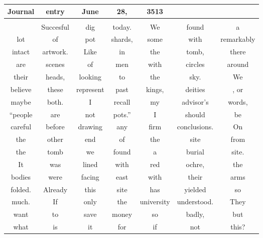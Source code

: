 {
  \Large
  \normalfont\wedn
\begin{tabular}{|ccccccc|}
  \hline
  Journal & entry & June & 28, & 3513 & & \\
  \hline
          & & & & & & \\
  \hline
          & Succesful & dig & today. & We & found & a \\
  \hline
  lot & of & pot & shards, & some & with & remarkably \\
  \hline
  intact & artwork. & Like & in & the & tomb, & there \\
  \hline
  are & scenes & of & men & with & circles & around \\
  \hline
  their & heads, & looking & to & the & sky. & We \\
  \hline
  believe & these & represent & past & kings, & deities &, or \\
  \hline
  maybe & both. & I & recall & my & advisor's & words, \\
  \hline
  ``people & are & not & pots.'' & I & should & be \\
  \hline
  careful & before & drawing & any & firm & conclusions. & On \\
  \hline
  the & other & end & of & the & site & from \\
  \hline
  the & tomb & we & found & a & burial & site. \\
  \hline
  It & was & lined & with & red & ochre, & the \\
  \hline
  bodies & were & facing & east & with & their & arms \\
  \hline
  folded. & Already & this & site & has & yielded & so \\
  \hline
  much. & If & only & the & university & understood. & They \\
  \hline
  want & to & save & money & so & badly, & but \\
  \hline
  what & is & it & for & if & not & this? \\
  \hline
\end{tabular}
}
